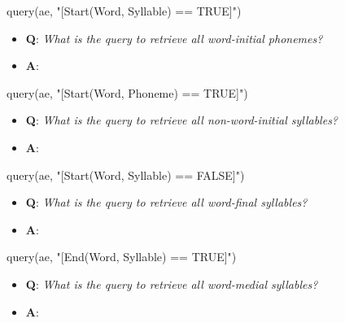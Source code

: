 \documentclass[
]{book}
\newenvironment{Shaded}{\begin{snugshade}}{\end{snugshade}}
\newcommand{\FunctionTok}[1]{\textcolor[rgb]{0.00,0.00,0.00}{#1}}
\newcommand{\NormalTok}[1]{#1}
\newcommand{\StringTok}[1]{\textcolor[rgb]{0.31,0.60,0.02}{#1}}
\providecommand{\tightlist}{%
  \setlength{\itemsep}{0pt}\setlength{\parskip}{0pt}}
\begin{document}
\begin{Shaded}
\begin{Highlighting}[]
\FunctionTok{query}\NormalTok{(ae, }\StringTok{"[Start(Word, Syllable) == TRUE]"}\NormalTok{)}
\end{Highlighting}
\end{Shaded}

\begin{itemize}
\tightlist
\item
  \textbf{Q}: \emph{What is the query to retrieve all word-initial phonemes?}
\item
  \textbf{A}:
\end{itemize}

\begin{Shaded}
\begin{Highlighting}[]
\FunctionTok{query}\NormalTok{(ae, }\StringTok{"[Start(Word, Phoneme) == TRUE]"}\NormalTok{)}
\end{Highlighting}
\end{Shaded}

\begin{itemize}
\tightlist
\item
  \textbf{Q}: \emph{What is the query to retrieve all non-word-initial syllables?}
\item
  \textbf{A}:
\end{itemize}

\begin{Shaded}
\begin{Highlighting}[]
\FunctionTok{query}\NormalTok{(ae, }\StringTok{"[Start(Word, Syllable) == FALSE]"}\NormalTok{)}
\end{Highlighting}
\end{Shaded}

\begin{itemize}
\tightlist
\item
  \textbf{Q}: \emph{What is the query to retrieve all word-final syllables?}
\item
  \textbf{A}:
\end{itemize}

\begin{Shaded}
\begin{Highlighting}[]
\FunctionTok{query}\NormalTok{(ae, }\StringTok{"[End(Word, Syllable) == TRUE]"}\NormalTok{)}
\end{Highlighting}
\end{Shaded}

\begin{itemize}
\tightlist
\item
  \textbf{Q}: \emph{What is the query to retrieve all word-medial syllables?}
\item
  \textbf{A}:
\end{itemize}
\end{document}

